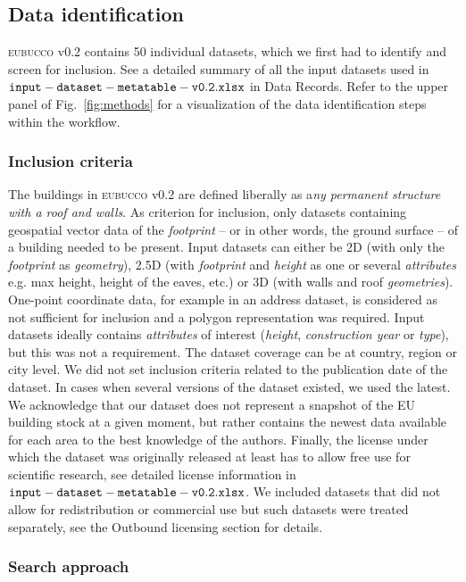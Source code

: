\documentclass[fleqn,10pt]{wlscirep}
\begin{document}
\subsection*{Data identification}

\textsc{eubucco} v0.2 contains 50 individual datasets, which we first had to identify and screen for inclusion. See a detailed summary of all the input datasets used in ${\tt input-dataset-metatable-v0.2.xlsx}$ in Data Records. Refer to the upper panel of Fig.~\ref{fig:methods} for a visualization of the data identification steps within the workflow.

\subsubsection*{Inclusion criteria}

The buildings in \textsc{eubucco} v0.2 are defined liberally as a\textit{ny permanent structure with a roof and walls}. 
As criterion for inclusion, only datasets containing geospatial vector data of the \textit{footprint} -- or in other words, the ground surface -- of a building needed to be present. 
Input datasets can either be 2D (with only the \textit{footprint} as \textit{geometry}), 2.5D (with \textit{footprint} and \textit{height} as one or several \textit{attributes} e.g. max height, height of the eaves, etc.) or 3D (with walls and roof \textit{geometries}). One-point coordinate data, for example in an address dataset, is considered as not sufficient for inclusion and a polygon representation was required.
Input datasets ideally contains \textit{attributes} of interest (\textit{height}, \textit{construction year} or \textit{type}), but this was not a requirement.
The dataset coverage can be at country, region or city level. 
We did not set inclusion criteria related to the publication date of the dataset. In cases when several versions of the dataset existed, we used the latest. We acknowledge that our dataset does not represent a snapshot of the EU building stock at a given moment, but rather contains the newest data available for each area to the best knowledge of the authors.
Finally, the license under which the dataset was originally released at least has to allow free use for scientific research, see detailed license information in ${\tt input-dataset-metatable-v0.2.xlsx}$. We included datasets that did not allow for redistribution or commercial use but such datasets were treated separately, see the Outbound licensing section for details.

\subsubsection*{Search approach}
\end{document}
